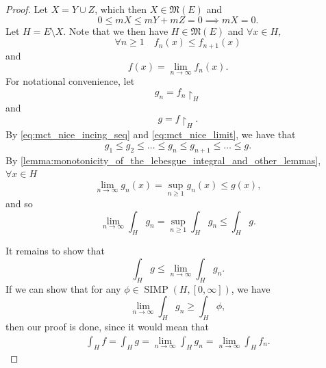 \documentclass[notoc,notitlepage]{tufte-book}
\DeclareMathOperator{\SIMP}{SIMP}
\begin{document}
\begin{proof}
  \noindent
   Let $X = Y \cup Z$, which then $X \in \mathfrak{M}(E)$ and
  \begin{equation*}
    0 \leq mX \leq mY + mZ = 0 \implies mX = 0.
  \end{equation*}
  Let $H = E \setminus X$. Note that we then have $H \in \mathfrak{M}(E)$ and
  $\forall x \in H$,
  \begin{equation}\label{eq:mct_nice_incing_seq}
    \forall n \geq 1 \quad f_n(x) \leq f_{n+1}(x)
  \end{equation}
  and
  \begin{equation}\label{eq:mct_nice_limit}
    f(x) = \lim_{n \to \infty} f_n(x).
  \end{equation}
  For notational convenience, let
  \begin{equation*}
    g_n = f_n \restriction_{H}
  \end{equation*}
  and
  \begin{equation*}
    g = f \restriction_{H}.
  \end{equation*}
  By \cref{eq:mct_nice_incing_seq} and \cref{eq:mct_nice_limit}, we have that
  \begin{equation*}
    g_1 \leq g_2 \leq \hdots \leq g_n \leq g_{n+1} \leq \hdots \leq g.
  \end{equation*}
  By \cref{lemma:monotonicity_of_the_lebesgue_integral_and_other_lemmas}, $\forall x
  \in H$
  \begin{equation*}
    \lim_{n \to \infty} g_n(x) = \sup_{n \geq 1} g_n(x) \leq g(x),
  \end{equation*}
  and so
  \begin{equation*}
    \lim_{n \to \infty} \int_{H} g_n = \sup_{n \geq 1} \int_{H} g_n \leq
    \int_{H} g.
  \end{equation*}

  It remains to show that
  \begin{equation*}
    \int_{H} g \leq \lim_{n \to \infty} \int_{H} g_n.
  \end{equation*}
  If we can show that for any $\phi \in \SIMP(H, [0, \infty])$, we have
  \begin{equation*}
    \lim_{n \to \infty} \int_{H} g_n \geq \int_{H} \phi,
  \end{equation*}
  then our proof is done, since it would mean that 
  \begin{align*}
    \int_{H} f = \int_{H} g = \lim_{n \to \infty} \int_{H} g_n = \lim_{n \to
    \infty} \int_{H} f_n.
  \end{align*}


\end{proof}
\end{document}

